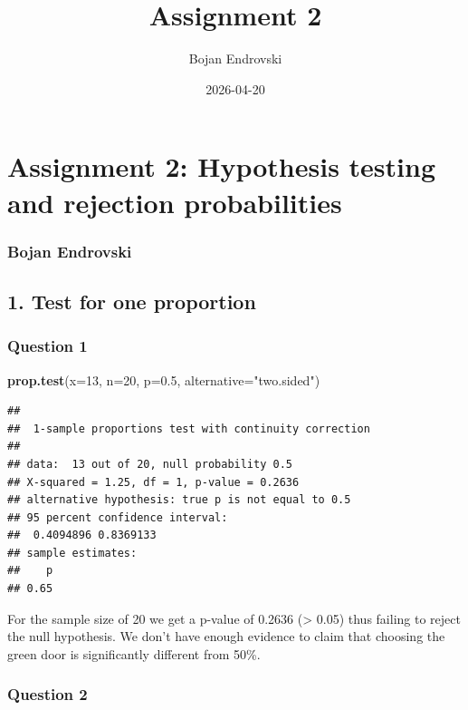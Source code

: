 \documentclass[
]{article}
\title{Assignment 2}
\author{Bojan Endrovski}
\date{2026-04-20}
\newenvironment{Shaded}{\begin{snugshade}}{\end{snugshade}}
\newcommand{\AttributeTok}[1]{\textcolor[rgb]{0.13,0.29,0.53}{#1}}
\newcommand{\DecValTok}[1]{\textcolor[rgb]{0.00,0.00,0.81}{#1}}
\newcommand{\FloatTok}[1]{\textcolor[rgb]{0.00,0.00,0.81}{#1}}
\newcommand{\FunctionTok}[1]{\textcolor[rgb]{0.13,0.29,0.53}{\textbf{#1}}}
\newcommand{\NormalTok}[1]{#1}
\newcommand{\StringTok}[1]{\textcolor[rgb]{0.31,0.60,0.02}{#1}}
\begin{document}
\maketitle

\section{Assignment 2: Hypothesis testing and rejection
probabilities}\label{assignment-2-hypothesis-testing-and-rejection-probabilities}

\subsubsection{Bojan Endrovski}\label{bojan-endrovski}

\subsection{1. Test for one proportion}\label{test-for-one-proportion}

\subsubsection{Question 1}\label{question-1}

\begin{Shaded}
\begin{Highlighting}[]
\FunctionTok{prop.test}\NormalTok{(}\AttributeTok{x=}\DecValTok{13}\NormalTok{, }\AttributeTok{n=}\DecValTok{20}\NormalTok{, }\AttributeTok{p=}\FloatTok{0.5}\NormalTok{, }\AttributeTok{alternative=}\StringTok{"two.sided"}\NormalTok{)}
\end{Highlighting}
\end{Shaded}

\begin{verbatim}
## 
##  1-sample proportions test with continuity correction
## 
## data:  13 out of 20, null probability 0.5
## X-squared = 1.25, df = 1, p-value = 0.2636
## alternative hypothesis: true p is not equal to 0.5
## 95 percent confidence interval:
##  0.4094896 0.8369133
## sample estimates:
##    p 
## 0.65
\end{verbatim}

For the sample size of 20 we get a p-value of 0.2636 (\textgreater{}
0.05) thus failing to reject the null hypothesis. We don't have enough
evidence to claim that choosing the green door is significantly
different from 50\%.

\subsubsection{Question 2}\label{question-2}
\end{document}
